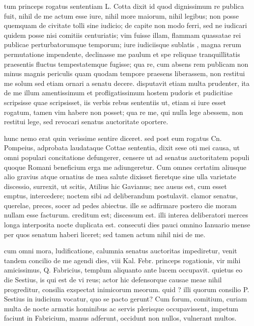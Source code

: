  tum princeps rogatus sententiam L. Cotta dixit id quod dignissimum re publica fuit, nihil de me actum esse iure, nihil more maiorum, nihil legibus; non posse quemquam de civitate tolli sine iudicio; de capite non modo ferri, sed ne iudicari quidem posse nisi comitiis centuriatis; vim fuisse illam, flammam quassatae rei publicae perturbatorumque temporum; iure iudiciisque sublatis , magna rerum permutatione impendente, declinasse me paulum et spe reliquae tranquillitatis praesentis fluctus tempestatemque fugisse; qua re, cum absens rem publicam non minus magnis periculis quam quodam tempore praesens liberassem, non restitui me solum sed etiam ornari a senatu decere. disputavit etiam multa prudenter, ita de me illum amentissimum et profligatissimum hostem pudoris et pudicitiae scripsisse quae scripsisset, iis verbis rebus sententiis ut, etiam si iure esset rogatum, tamen vim habere non posset; qua re me, qui nulla lege abessem, non restitui lege, sed revocari senatus auctoritate oportere.

 hunc nemo erat quin verissime sentire diceret. sed post eum rogatus Cn. Pompeius, adprobata laudataque Cottae sententia, dixit sese oti mei causa, ut omni populari concitatione defungerer, censere ut ad senatus auctoritatem populi quoque Romani beneficium erga me adiungeretur. Cum omnes certatim aliusque alio gravius atque ornatius de mea salute dixisset fieretque sine ulla varietate discessio, surrexit, ut scitis, Atilius hic Gavianus; nec ausus est, cum esset emptus, intercedere; noctem sibi ad deliberandum postulavit. clamor senatus, querelae, preces, socer ad pedes abiectus. ille se adfirmare postero die moram nullam esse facturum. creditum est; discessum est. illi interea deliberatori merces longa interposita nocte duplicata est. consecuti dies pauci omnino Ianuario mense per quos senatum haberi liceret; sed tamen actum nihil nisi de me.

 cum omni mora, ludificatione, calumnia senatus auctoritas impediretur, venit tandem concilio de me agendi dies, viii Kal. Febr. princeps rogationis, vir mihi amicissimus, Q. Fabricius, templum aliquanto ante lucem occupavit. quietus eo die Sestius, is qui est de vi reus; actor hic defensorque causae meae nihil progreditur, consilia exspectat inimicorum meorum. quid ? illi quorum consilio P. Sestius in iudicium vocatur, quo se pacto gerunt? Cum forum, comitium, curiam multa de nocte armatis hominibus ac servis plerisque occupavissent, impetum faciunt in Fabricium, manus adferunt, occidunt non nullos, vulnerant multos.


